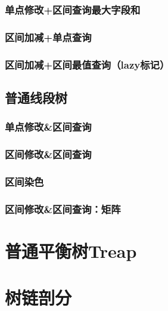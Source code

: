 \documentclass{article}
\begin{document}
\subsubsection{单点修改+区间查询最大字段和}

\subsubsection{区间加减+单点查询}

\subsubsection{区间加减+区间最值查询（lazy标记）}

\subsection{普通线段树}
\subsubsection{单点修改&区间查询}

\subsubsection{区间修改&区间查询}

\subsubsection{区间染色}

\subsubsection{区间修改&区间查询：矩阵}



\section{普通平衡树Treap}


\section{树链剖分}

\end{document}
